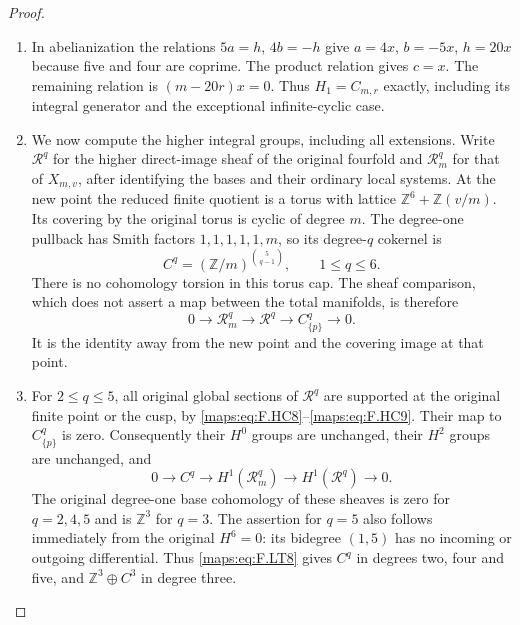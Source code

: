 \documentclass[11pt,a4paper]{article}
\theoremstyle{definition}
\begin{document}
\begin{proof}
\begin{enumerate}[label=\arabic*.]
\item In abelianization the relations $5a=h$, $4b=-h$
give $a=4x$, $b=-5x$, $h=20x$ because five and four
are coprime.
The product relation gives $c=x$.
The remaining relation is $(m-20r)x=0$.
Thus $H_1=C_{m,r}$ exactly, including its integral
generator and the exceptional infinite-cyclic case.

\item We now compute the higher integral groups, including
all extensions.
Write $\mathcal R^q$ for the higher direct-image
sheaf of the original fourfold and
$\mathcal R_m^q$ for that of $X_{m,v}$, after identifying
the bases and their ordinary local systems.
At the new point the reduced finite quotient is a
torus with lattice
$\mathbb Z^6+\mathbb Z(v/m)$.
Its covering by the original torus is cyclic of
degree $m$.
The degree-one pullback has Smith factors
$1,1,1,1,1,m$, so its degree-$q$ cokernel is
\[
 C^q=(\mathbb Z/m)^{\binom5{q-1}},
 \qquad 1\le q\le6 .
\tag{F.LT6}\label{maps:eq:F.LT6}
\]
There is no cohomology torsion in this torus cap.
The sheaf comparison, which does not assert a map
between the total manifolds, is therefore
\[
 0\longrightarrow\mathcal R_m^q
  \longrightarrow\mathcal R^q
  \longrightarrow C^q_{\{p\}}\longrightarrow0 .
\tag{F.LT7}\label{maps:eq:F.LT7}
\]
It is the identity away from the new point and the
covering image at that point.

\item For $2\le q\le5$, all original global sections of
$\mathcal R^q$ are supported at the original finite
point or the cusp, by \eqref{maps:eq:F.HC8}--\eqref{maps:eq:F.HC9}.
Their map to $C^q_{\{p\}}$ is zero.
Consequently their $H^0$ groups are unchanged,
their $H^2$ groups are unchanged, and
\[
 0\longrightarrow C^q
  \longrightarrow H^1(\mathcal R_m^q)
  \longrightarrow H^1(\mathcal R^q)
  \longrightarrow0 .
\tag{F.LT8}\label{maps:eq:F.LT8}
\]
The original degree-one base cohomology of these
sheaves is zero for $q=2,4,5$ and is $\mathbb Z^3$
for $q=3$.
The assertion for $q=5$ also follows immediately
from the original $H^6=0$: its bidegree $(1,5)$
has no incoming or outgoing differential.
Thus \eqref{maps:eq:F.LT8} gives $C^q$ in degrees two, four and
five, and $\mathbb Z^3\oplus C^3$ in degree three.


\end{enumerate}
\end{proof}
\end{document}
